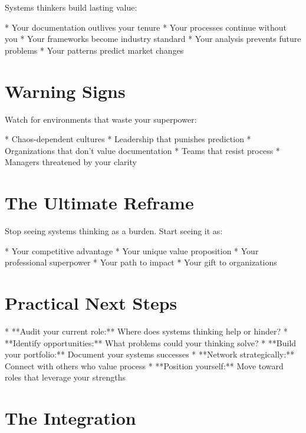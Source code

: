 \documentclass[12pt,oneside]{book}
\begin{document}
Systems thinkers build lasting value:

                    * Your documentation outlives your tenure
                    * Your processes continue without you
                    * Your frameworks become industry standard
                    * Your analysis prevents future problems
                    * Your patterns predict market changes

\section{Warning Signs}

Watch for environments that waste your superpower:

                    * Chaos-dependent cultures
                    * Leadership that punishes prediction
                    * Organizations that don't value documentation
                    * Teams that resist process
                    * Managers threatened by your clarity

\section{The Ultimate Reframe}

Stop seeing systems thinking as a burden. Start seeing it as:

                    * Your competitive advantage
                    * Your unique value proposition
                    * Your professional superpower
                    * Your path to impact
                    * Your gift to organizations

\section{Practical Next Steps}

                    * **Audit your current role:** Where does systems thinking help or hinder?
                    * **Identify opportunities:** What problems could your thinking solve?
                    * **Build your portfolio:** Document your systems successes
                    * **Network strategically:** Connect with others who value process
                    * **Position yourself:** Move toward roles that leverage your strengths

\section{The Integration}
\end{document}
